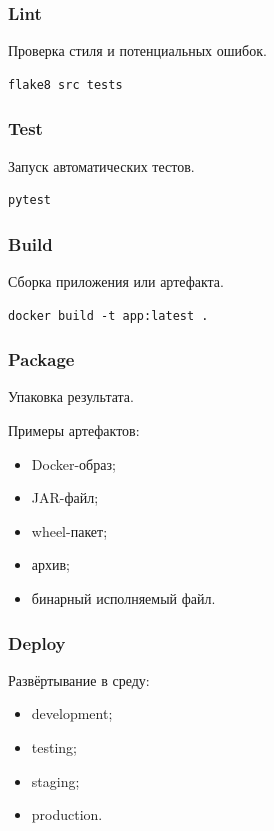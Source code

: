 \documentclass[12pt,a4paper]{article}
\begin{document}
\subsubsection{Lint}

Проверка стиля и потенциальных ошибок.

\begin{lstlisting}
flake8 src tests
\end{lstlisting}

\subsubsection{Test}

Запуск автоматических тестов.

\begin{lstlisting}
pytest
\end{lstlisting}

\subsubsection{Build}

Сборка приложения или артефакта.

\begin{lstlisting}
docker build -t app:latest .
\end{lstlisting}

\subsubsection{Package}

Упаковка результата.

Примеры артефактов:

\begin{itemize}
    \item Docker-образ;
    \item JAR-файл;
    \item wheel-пакет;
    \item архив;
    \item бинарный исполняемый файл.
\end{itemize}

\subsubsection{Deploy}

Развёртывание в среду:

\begin{itemize}
    \item development;
    \item testing;
    \item staging;
    \item production.
\end{itemize}
\end{document}
